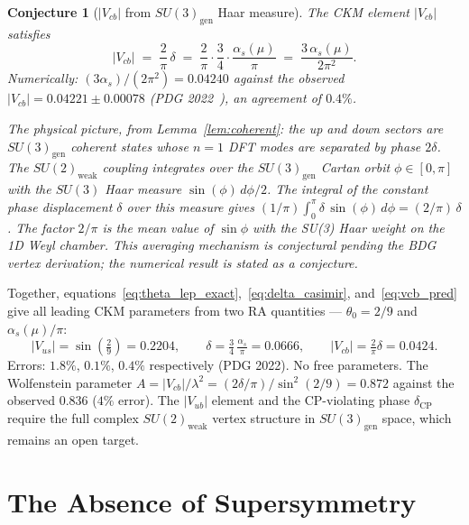 \documentclass[11pt,a4paper]{article}
\newtheorem{conjecture}[theorem]{Conjecture}
\begin{document}
\begin{conjecture}[$|V_{cb}|$ from $SU(3)_{\mathrm{gen}}$ Haar measure]
\label{conj:vcb}
The CKM element $|V_{cb}|$ satisfies
\begin{equation}
  |V_{cb}| \;=\; \frac{2}{\pi}\,\delta
  \;=\; \frac{2}{\pi}\cdot\frac{3}{4}\cdot\frac{\alpha_s(\mu)}{\pi}
  \;=\; \frac{3\,\alpha_s(\mu)}{2\pi^2}.
  \label{eq:vcb_pred}
\end{equation}
Numerically: $(3\alpha_s)/(2\pi^2) = 0.04240$ against the observed
$|V_{cb}| = 0.04221 \pm 0.00078$ (PDG 2022~\citep{PDG2022}), an
agreement of $0.4\%$.

The physical picture, from Lemma~\ref{lem:coherent}: the up and
down sectors are $SU(3)_{\mathrm{gen}}$ coherent states whose $n=1$
DFT modes are separated by phase $2\delta$. The $SU(2)_{\mathrm{weak}}$
coupling integrates over the $SU(3)_{\mathrm{gen}}$ Cartan orbit
$\phi \in [0,\pi]$ with the $SU(3)$ Haar measure $\sin(\phi)\,d\phi/2$.
The integral of the constant phase displacement $\delta$ over this measure
gives $(1/\pi)\int_0^\pi \delta\,\sin(\phi)\,d\phi = (2/\pi)\,\delta$.
The factor $2/\pi$ is the mean value of $\sin\phi$ with the SU(3)
Haar weight on the 1D Weyl chamber. This averaging mechanism is
conjectural pending the BDG vertex derivation; the numerical result
is stated as a conjecture.
\end{conjecture}

Together, equations~\eqref{eq:theta_lep_exact},~\eqref{eq:delta_casimir},
and~\eqref{eq:vcb_pred} give all leading CKM parameters from two
RA quantities --- $\theta_0 = 2/9$ and $\alpha_s(\mu)/\pi$:
\begin{equation}
  |V_{us}| = \sin\!\left(\tfrac{2}{9}\right) = 0.2204,
  \qquad
  \delta = \tfrac{3}{4}\,\tfrac{\alpha_s}{\pi} = 0.0666,
  \qquad
  |V_{cb}| = \tfrac{2}{\pi}\delta = 0.0424.
  \label{eq:ckm_summary}
\end{equation}
Errors: $1.8\%$, $0.1\%$, $0.4\%$ respectively (PDG 2022).
No free parameters. The Wolfenstein parameter
$A = |V_{cb}|/\lambda^2 = (2\delta/\pi)/\sin^2(2/9) = 0.872$
against the observed $0.836$ ($4\%$ error).
The $|V_{ub}|$ element and the CP-violating phase $\delta_{\mathrm{CP}}$
require the full complex $SU(2)_{\mathrm{weak}}$
vertex structure in $SU(3)_{\mathrm{gen}}$ space, which remains an open target.

\section{The Absence of Supersymmetry}
\label{sec:susy}
\end{document}
